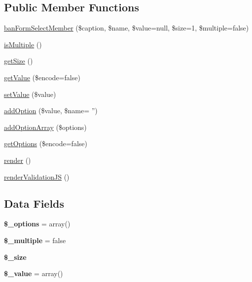 \subsection*{Public Member Functions}
\begin{DoxyCompactItemize}
\item 
\hyperlink{classban_form_select_member_a55e03b335b86cf2a808aab75f91a2f22}{ban\-Form\-Select\-Member} (\$caption, \$name, \$value=null, \$size=1, \$multiple=false)
\item 
\hyperlink{classban_form_select_member_ac5d76ccb2e931e4abb4456d6ad492ac1}{is\-Multiple} ()
\item 
\hyperlink{classban_form_select_member_a75cce10cdf81be6dc84881c28b3379b7}{get\-Size} ()
\item 
\hyperlink{classban_form_select_member_ab3c79e314dfd09da4de90fb2ce5eaa9d}{get\-Value} (\$encode=false)
\item 
\hyperlink{classban_form_select_member_a7494441b6ed08a391704971873f31432}{set\-Value} (\$value)
\item 
\hyperlink{classban_form_select_member_ac485d7f4f2160de8fb47aa29aeed7080}{add\-Option} (\$value, \$name= '')
\item 
\hyperlink{classban_form_select_member_a673ec8d6dc3cc0ee2f62fbe1c824ccc5}{add\-Option\-Array} (\$options)
\item 
\hyperlink{classban_form_select_member_ac15eda2814c8ff0477244b28a315fb5a}{get\-Options} (\$encode=false)
\item 
\hyperlink{classban_form_select_member_afde88292c44dc59faf017738dae6dffb}{render} ()
\item 
\hyperlink{classban_form_select_member_a2747262e7fc6aba84bfc52bcf38407df}{render\-Validation\-J\-S} ()
\end{DoxyCompactItemize}
\subsection*{Data Fields}
\begin{DoxyCompactItemize}
\item 
\hypertarget{classban_form_select_member_a1bebdc689c84eee59ad24c77e5531762}{{\bfseries \$\-\_\-options} = array()}\label{classban_form_select_member_a1bebdc689c84eee59ad24c77e5531762}

\item 
\hypertarget{classban_form_select_member_acae132bb5063b7d542ea6a0be0ae22f2}{{\bfseries \$\-\_\-multiple} = false}\label{classban_form_select_member_acae132bb5063b7d542ea6a0be0ae22f2}

\item 
\hypertarget{classban_form_select_member_a3f3a27f0a14f4760227dbc5ae3288681}{{\bfseries \$\-\_\-size}}\label{classban_form_select_member_a3f3a27f0a14f4760227dbc5ae3288681}

\item 
\hypertarget{classban_form_select_member_a599c02a4727030b8ecc632f7c8adafeb}{{\bfseries \$\-\_\-value} = array()}\label{classban_form_select_member_a599c02a4727030b8ecc632f7c8adafeb}

\end{DoxyCompactItemize}


